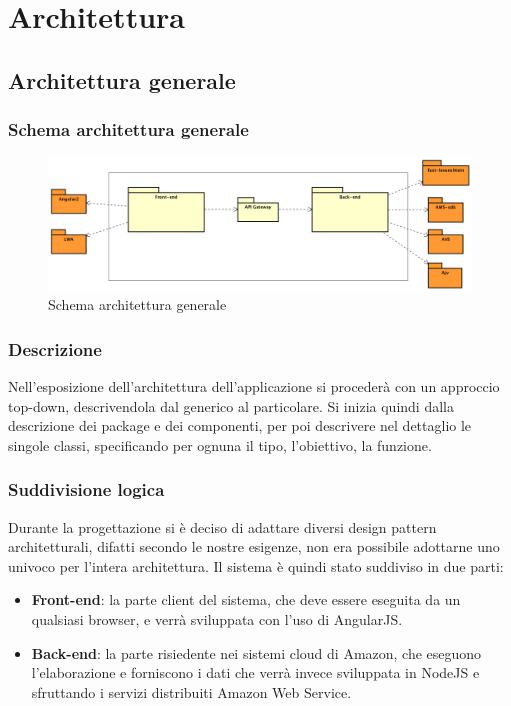 \documentclass[../ManualeSviluppatore_v2.0.0.tex]{subfiles}
\begin{document}
\section{Architettura}

	\subsection{Architettura generale}
		\subsubsection{Schema architettura generale}
			\begin{figure}[!h]
				\centering
				\includegraphics[width=\textwidth]{Architettura/AltoLivello.png}
				\caption{Schema architettura generale}
			\end{figure}

		\subsubsection{Descrizione}
		Nell'esposizione dell'architettura dell'applicazione si procederà con un approccio \gls{top-down}, descrivendola dal generico al particolare. Si inizia quindi dalla descrizione dei package e dei componenti, per poi descrivere nel dettaglio le singole classi, specificando per ognuna il tipo, l'obiettivo, la funzione.

		\subsubsection{Suddivisione logica}
			Durante la progettazione si è deciso di adattare diversi \gls{design pattern architetturali},
			difatti secondo le nostre esigenze, non era possibile adottarne uno univoco per l'intera architettura.
			Il sistema è quindi stato suddiviso in due parti:
			\begin{itemize}
				\item \textbf{Front-end}: la parte client del sistema, che deve essere eseguita da un qualsiasi browser, e verrà sviluppata con l'uso di AngularJS.
				\item \textbf{Back-end}: la parte risiedente nei sistemi cloud di Amazon, che eseguono l'elaborazione e forniscono i dati che verrà invece sviluppata in NodeJS e sfruttando i servizi distribuiti Amazon Web Service.
			\end{itemize}
\end{document}
